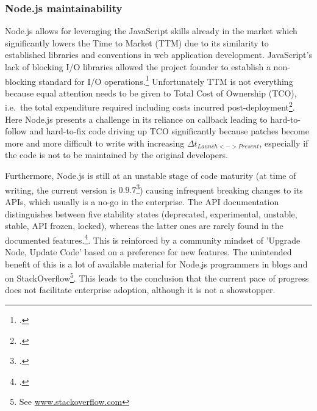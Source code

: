 \subsubsection{Node.js maintainability}

Node.js allows for leveraging the JavaScript skills already in the market which
significantly lowers the Time to Market (TTM)
due to its similarity to established libraries and conventions in web application
development. JavaScript's lack of blocking I/O libraries allowed the project
founder to establish a non-blocking standard for I/O operations.\footcite[Cf.][p.10 et sqq.]{Croucher_2012}
Unfortunately TTM is not everything because equal attention needs
to be given to Total Cost of Ownership (TCO), i.e.\ the total expenditure required including costs incurred
post-deployment\footcite[Cf.][203-207]{holtsnider_2010}. 
Here Node.js presents a challenge in its reliance on callback
leading to hard-to-follow and hard-to-fix code driving up TCO significantly
because patches become more and more difficult to write with increasing $\Delta
t_{Launch<->Present}$, especially if the code is not to be maintained by the %
original developers.

Furthermore, Node.js is still at an unstable stage of code maturity (at time of
writing, the current version is $0.9.7$\footcite[Cf.][]{node_unstable_2013})
causing infrequent breaking changes to its APIs, which usually is a no-go in the enterprise.
The API documentation distinguishes between five stability states (deprecated,
experimental, unstable, stable, API frozen, locked), whereas the latter ones are
rarely found in the documented features.\footcite[Cf.][] {node_2012}.
This is reinforced by a community mindset of 'Upgrade Node, Update Code' based
on a preference for new features. The unintended benefit of this is a lot of
available material for Node.js programmers in blogs and on
StackOverflow\footnote{See \url{www.stackoverflow.com}}.
This leads to the conclusion that the current pace of progress does not
facilitate enterprise adoption, although it is not a showstopper.

